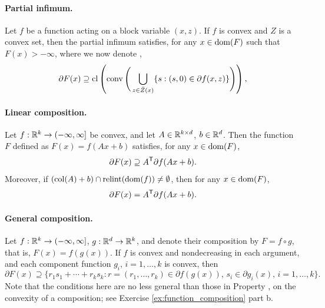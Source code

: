 \paragraph{Partial infimum.}

Let $f$ be a function acting on a block variable $(x,z)$. If $f$ is convex and
$Z$ is a convex set, then the partial infimum  satisfies, for any $x \in \operatorname{dom}(F)$ such that $F(x) > -\infty$,  
where we now denote , 
\[
\partial F(x) \supseteq \operatorname{cl}\left( \operatorname{conv}\Bigg( \bigcup_{z \in \bar{Z}(x)} 
\{ s : (s, 0) \in \partial f(x, z) \} \Bigg)\right),  
\]

\paragraph{Linear composition.}

Let $f : \mathbb{R}^k \to (-\infty, \infty]$ be convex, and let $A \in \mathbb{R}^{k \times d}$,
$b \in \mathbb{R}^d$. Then the function $F$ defined as $F(x) = f(Ax+b)$ satisfies, for 
any $x \in \operatorname{dom}(F)$, 
\[
\partial F(x) \supseteq A^{\mathsf{T}} \partial f(Ax + b).
\]
Moreover, if $(\operatorname{col}(A) + b) \cap \operatorname{relint}(\operatorname{dom}(f)) \not= \emptyset$, then for any  
$x \in \operatorname{dom}(F)$,  
\[
\partial F(x) = A^{\mathsf{T}} \partial f(Ax + b).
\]


\paragraph{General composition.}

Let $f : \mathbb{R}^k \to (-\infty, \infty]$, $g : \mathbb{R}^d \to \mathbb{R}^k$, and denote their
composition by $F = f \circ g$, that is, $F(x) = f(g(x))$. If $f$ is convex and
nondecreasing in each argument, and each component function $g_i$,
$i=1,\dots,k$ is convex, then  
\[
\partial F(x) \supseteq \{ r_1 s_1 + \cdots + r_k s_k : r = (r_1, \dots, r_k)
\in \partial f(g(x)), \, s_i \in \partial g_i(x), \, i=1,\dots,k \big\}.
\]
Note that the conditions here are no less general than those in Property
, on the convexity of a composition; see
Exercise \ref{ex:function_composition} part b.

\medskip

